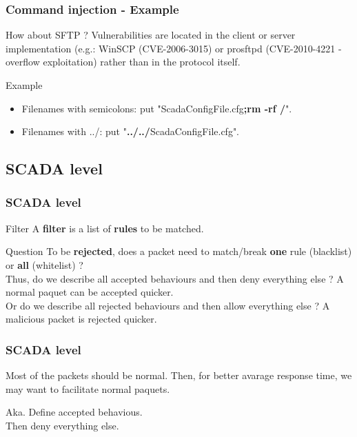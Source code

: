\documentclass{beamer}
\begin{document}
\begin{frame}
    \frametitle{Command injection - Example}
    \begin{block}{How about SFTP ?}
        Vulnerabilities are located in the client or server implementation (e.g.: WinSCP (CVE-2006-3015) or prosftpd (CVE-2010-4221 - overflow exploitation) rather than in the protocol itself.
    \end{block}
    \vfill
    \begin{block}{Example}
    	\begin{itemize}
            \item Filenames with semicolons: put "ScadaConfigFile.cfg{\bf ;rm -rf /}".
            \item Filenames with ../: put "{\bf ../../}ScadaConfigFile.cfg".
        \end{itemize}
    \end{block}
\end{frame}

\subsection{SCADA level}

\begin{frame}
    \frametitle{SCADA level}
    
    \begin{block}{Filter}
    	A {\bf filter} is a list of {\bf rules} to be matched.
    \end{block}
    \vfill
    \begin{block}{Question}
        To be {\bf rejected}, does a packet need to match/break {\bf one} rule (blacklist) or {\bf all} (whitelist) ?\\
    	\medskip
    	Thus, do we describe all accepted behaviours and then deny everything else ? A normal paquet can be accepted quicker.\\
    	\medskip
    	Or do we describe all rejected behaviours and then allow everything else ? A malicious packet is rejected quicker.
    \end{block}
\end{frame}

\begin{frame}
    \frametitle{SCADA level}
    
    Most of the packets should be normal.
    \vfill
    Then, for better avarage response time, we may want to facilitate normal paquets.
    \medskip
    \begin{block}{Aka.}
    	Define accepted behavious.\\
    	Then deny everything else.
    \end{block}
\end{frame}
\end{document}
